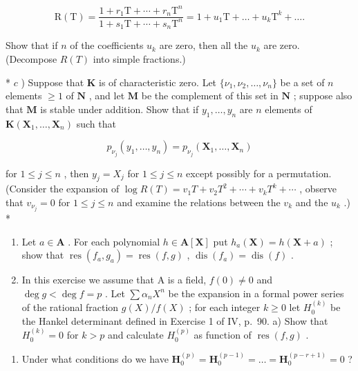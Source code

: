 \[
\mathrm{R} (\mathrm{T}) = \frac {1 + r _ {1} \mathrm{T} + \cdots + r _ {n} \mathrm{T} ^ {n}}{1 + s _ {1} \mathrm{T} + \cdots + s _ {n} \mathrm{T} ^ {n}} = 1 + u _ {1} \mathrm{T} + \dots + u _ {k} \mathrm{T} ^ {k} + \dots .
\]

Show that if \(n\) of the coefficients \(u_{k}\) are zero, then all the \(u_{k}\) are zero. (Decompose \(R(T)\) into simple fractions.)

* \(c\) ) Suppose that \(\mathbf{K}\) is of characteristic zero. Let \(\{\nu_1,\nu_2,\dots,\nu_n\}\) be a set of \(n\) elements \(\geqslant 1\) of \(\mathbf{N}\) , and let \(\mathbf{M}\) be the complement of this set in \(\mathbf{N}\) ; suppose also that \(\mathbf{M}\) is stable under addition. Show that if \(y_{1},\ldots ,y_{n}\) are \(n\) elements of \(\mathbf{K}(\mathbf{X}_1,\dots,\mathbf{X}_n)\) such that

\[
p _ {\nu _ {j}} (y _ {1}, \dots , y _ {n}) = p _ {\nu _ {j}} (\mathbf {X} _ {1}, \dots , \mathbf {X} _ {n})
\]

for \(1 \leqslant j \leqslant n\) , then \(y_{j} = X_{j}\) for \(1 \leqslant j \leqslant n\) except possibly for a permutation. (Consider the expansion of \(\log R(T) = v_{1}T + v_{2}T^{2} + \cdots + v_{k}T^{k} + \cdots\) , observe that \(v_{\nu_{j}} = 0\) for \(1 \leqslant j \leqslant n\) and examine the relations between the \(v_{k}\) and the \(u_{k}\) .) *

\begin{enumerate}
\def\labelenumi{\arabic{enumi})}
\setcounter{enumi}{9}
\item
  Let \(a \in \mathbf{A}\) . For each polynomial \(h \in \mathbf{A}[\mathbf{X}]\) put \(h_a(\mathbf{X}) = h(\mathbf{X} + a)\) ; show that \(\operatorname{res}(f_a, g_a) = \operatorname{res}(f, g)\) , \(\operatorname{dis}(f_a) = \operatorname{dis}(f)\) .
\item
  In this exercise we assume that A is a field, \(f(0) \neq 0\) and \(\deg g < \deg f = p\) . Let \(\sum \alpha_{n} X^{n}\) be the expansion in a formal power series of the rational fraction \(g(X) / f(X)\) ; for each integer \(k \geqslant 0\) let \(H_{0}^{(k)}\) be the Hankel determinant defined in Exercise 1 of IV, p.~90. a) Show that \(H_{0}^{(k)} = 0\) for \(k > p\) and calculate \(H_{0}^{(p)}\) as function of \(\operatorname{res}(f, g)\) .
\end{enumerate}

\begin{enumerate}
\def\labelenumi{\alph{enumi})}
\setcounter{enumi}{1}
\tightlist
\item
  Under what conditions do we have \(\mathbf{H}_0^{(p)} = \mathbf{H}_0^{(p - 1)} = \ldots = \mathbf{H}_0^{(p - r + 1)} = 0\) ?
\end{enumerate}

